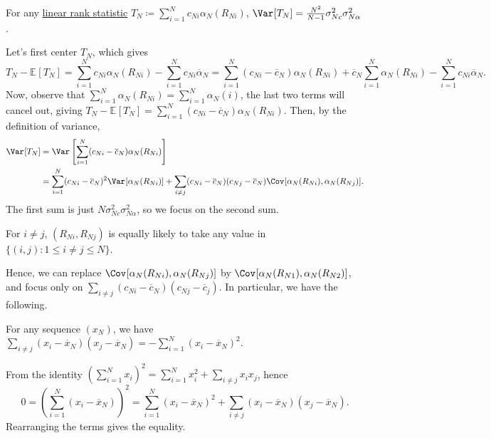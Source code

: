\begin{claim}
	For any \hyperref[def:linrea-rank-statistic]{linear rank statistic} \(T_N \coloneqq \sum_{i=1}^{N} c_{Ni} \alpha _N (R_{Ni})\), \(\Var_{}[T_N] = \frac{N^2}{N-1} \sigma _{Nc}^2 \sigma _{N \alpha }^2\).
\end{claim}
\begin{explanation}
	Let's first center \(T_N\), which gives
	\[
		T_N - \mathbb{E}_{}[T_N]
		= \sum_{i=1}^{N} c_{Ni} \alpha _N(R_{Ni}) - \sum_{i=1}^{N} c_{Ni} \overline{\alpha} _N
		= \sum_{i=1}^{N} (c_{Ni} - \overline{c} _N) \alpha _N(R_{Ni}) + \overline{c} _N \sum_{i=1}^{N} \alpha _N(R_{Ni}) - \sum_{i=1}^{N} c_{Ni} \overline{\alpha} _N .
	\]
	Now, observe that \(\sum_{i=1}^{N} \alpha _N(R_{Ni}) = \sum_{i=1}^{N} \alpha _N(i)\), the last two terms will cancel out, giving \(T_N - \mathbb{E}_{}[T_N] = \sum_{i=1}^{N} (c_{Ni} - \overline{c} _N) \alpha _N(R_{Ni})\). Then, by the definition of variance,
	\[
		\begin{split}
			\Var_{}[T_N]
			 & = \Var_{}\left[\sum_{i=1}^{N} (c_{Ni} - \overline{c} _N) \alpha _N(R_{Ni})\right]                                                                                                               \\
			 & = \sum_{i=1}^{N} (c_{Ni} - \overline{c} _N)^2 \Var_{}[\alpha _N(R_{Ni})] + \sum_{i \neq j} (c_{Ni} - \overline{c} _N)(c_{Nj} - \overline{c} _N) \Cov_{}[\alpha _N(R_{Ni}) , \alpha _N(R_{Nj})].
		\end{split}
	\]
	The first sum is just \(N \sigma _{Nc}^2 \sigma _{N \alpha }^2\), so we focus on the second sum.

	\begin{intuition}
		For \(i \neq j\), \((R_{Ni}, R_{Nj})\) is equally likely to take any value in \(\{ (i, j) \colon 1 \leq i \neq j \leq N\}\).
	\end{intuition}

	Hence, we can replace \(\Cov_{}[\alpha _N(R_{Ni}), \alpha _N(R_{Nj})] \) by \(\Cov_{}[\alpha _N(R_{N1}), \alpha _N(R_{N2})]\), and focus only on \(\sum_{i \neq j} (c_{Ni} - \overline{c} _N)(c_{Nj}- \overline{c} _j)\). In particular, we have the following.

	\begin{note}
		For any sequence \((x_N)\), we have \(\sum_{i \neq j} (x_i - \overline{x} _N)(x_j - \overline{x} _N) = - \sum_{i=1}^{N} (x_i - \overline{x} _N)^2\).
	\end{note}
	\begin{explanation}
		From the identity \(( \sum_{i=1}^{N} x_i ) ^2 = \sum_{i=1}^{N} x_i^2 + \sum_{i \neq j} x_i x_j \), hence
		\[
			0
			= \left( \sum_{i=1}^{N} (x_i - \overline{x} _N) \right) ^2
			= \sum_{i=1}^{N} (x_i - \overline{x} _N)^2 + \sum_{i \neq j} (x_i - \overline{x} _N)(x_j - \overline{x} _N).
		\]
		Rearranging the terms gives the equality.
	\end{explanation}


\end{explanation}
